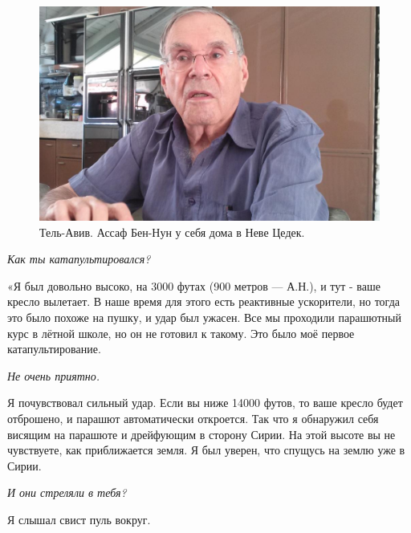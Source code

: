 \begin{figure}[h!tb] 
	\centering\includegraphics[scale=0.4]{History_BenNun/k2t_Wfyj1Lw.jpg}
	\caption{Тель-Авив. Ассаф Бен-Нун у себя дома в Неве Цедек. }%
\end{figure}

\textit{Как ты катапультировался?}

«Я был довольно высоко, на 3000 футах (900 метров — А.Н.), и тут - ваше кресло вылетает. В наше время для этого есть реактивные ускорители, но тогда это было похоже на пушку, и удар был ужасен. Все мы проходили парашютный курс в лётной школе, но он не готовил к такому. Это было моё первое катапультирование.

\textit{Не очень приятно.}

Я почувствовал сильный удар. Если вы ниже 14000 футов, то ваше кресло будет отброшено, и парашют автоматически откроется. Так что я обнаружил себя висящим на парашюте и дрейфующим в сторону Сирии. На этой высоте вы не чувствуете, как приближается земля. Я был уверен, что спущусь на землю уже в Сирии.

\textit{И они стреляли в тебя?}

Я слышал свист пуль вокруг. 

